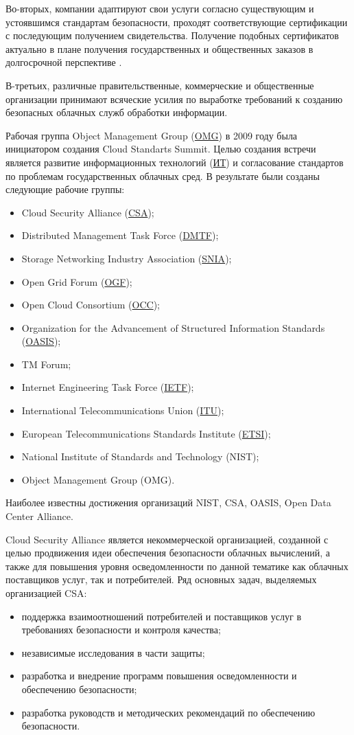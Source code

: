 Во-вторых, компании адаптируют свои услуги согласно существующим и устоявшимся стандартам безопасности, проходят соответствующие сертификации с последующим получением свидетельства.
Получение подобных сертификатов актуально в плане получения государственных и общественных заказов в долгосрочной перспективе \cite{itmo}.

В-третьих, различные правительственные, коммерческие и общественные организации принимают всяческие усилия по выработке требований к созданию безопасных облачных служб обработки информации.

Рабочая группа Object Management Group (\hyperlink{omg}{OMG}) в 2009 году была инициатором создания Cloud Standarts Summit.
Целью создания встречи является развитие информационных технологий (\hyperlink{it}{ИТ}) и согласование стандартов по проблемам государственных облачных сред.
В результате были созданы следующие рабочие группы:
\begin{itemize}
  \item Cloud Security Alliance (\hyperlink{csa}{CSA});
  \item Distributed Management Task Force (\hyperlink{dmtf}{DMTF});
  \item Storage Networking Industry Association (\hyperlink{snia}{SNIA});
  \item Open Grid Forum (\hyperlink{ogf}{OGF});
  \item Open Cloud Consortium (\hyperlink{occ}{OCC});
  \item Organization for the Advancement of Structured Information Standards (\hyperlink{oasis}{OASIS});
  \item TM Forum;
  \item Internet Engineering Task Force (\hyperlink{ietf}{IETF});
  \item International Telecommunications Union (\hyperlink{itu}{ITU});
  \item European Telecommunications Standards Institute (\hyperlink{etsi}{ETSI});
  \item National Institute of Standards and Technology (NIST);
  \item Object Management Group (OMG).
\end{itemize}

Наиболее известны достижения организаций NIST, CSA, OASIS, Open Data Center Alliance.

Cloud Security Alliance является некоммерческой организацией, созданной с целью продвижения идеи обеспечения безопасности облачных вычислений, а также для повышения уровня осведомленности по данной тематике как облачных поставщиков услуг, так и потребителей.
Ряд основных задач, выделяемых организацией CSA:
\begin{itemize}
  \item поддержка взаимоотношений потребителей и поставщиков услуг в требованиях безопасности и контроля качества;
  \item независимые исследования в части защиты;
  \item разработка и внедрение программ повышения осведомленности и обеспечению безопасности;
  \item разработка руководств и методических рекомендаций по обеспечению безопасности.
\end{itemize}

